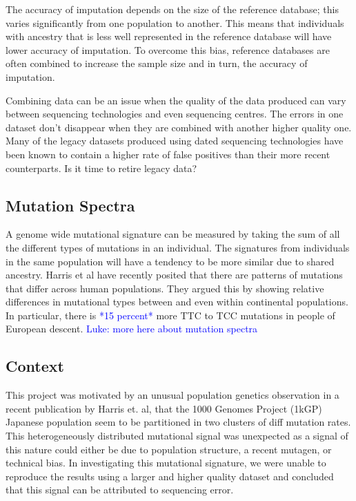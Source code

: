 \documentclass[]{elife}
\newcommand{\luke}[1]{\textcolor{blue}{Luke: #1}}
\newcommand{\todo}[1]{\textcolor{blue}{*#1*}}
\begin{document}
The accuracy of imputation depends on the size of the reference database; this varies significantly from one population to another.
This means that individuals with ancestry that is less well represented in the reference database will have lower accuracy of imputation.
To overcome this bias, reference databases are often combined to increase the sample size and in turn, the accuracy of imputation.


Combining data can be an issue when the quality of the data produced can vary between sequencing technologies and even sequencing centres.
The errors in one dataset don't disappear when they are combined with another higher quality one. 
Many of the legacy datasets produced using dated sequencing technologies have been known to contain a higher rate of false positives than their more recent counterparts.
Is it time to retire legacy data? 

	\subsection{Mutation Spectra} 
A genome wide mutational signature can be measured by taking the sum of all the different types of mutations in an individual. 
The signatures from individuals in the same population will have a tendency to be more similar due to shared ancestry.
Harris et al have recently posited that there are patterns of mutations that differ across human populations.
They argued this by showing relative differences in mutational types between and even within continental populations.
In particular, there is \todo{15 percent} more TTC to TCC mutations in people of European descent.
\luke{more here about mutation spectra}

	\subsection{Context}
This project was motivated by an unusual population genetics observation in a recent publication by Harris et. al, that the 1000 Genomes Project (1kGP) Japanese population seem to be partitioned in two clusters of diff mutation rates. 
This heterogeneously distributed mutational signal was unexpected as a signal of this nature could either be due to population structure, a recent mutagen, or technical bias.
In investigating this mutational signature, we were unable to reproduce the results using a larger and higher quality dataset and concluded that this signal can be attributed to sequencing error.
\end{document}
